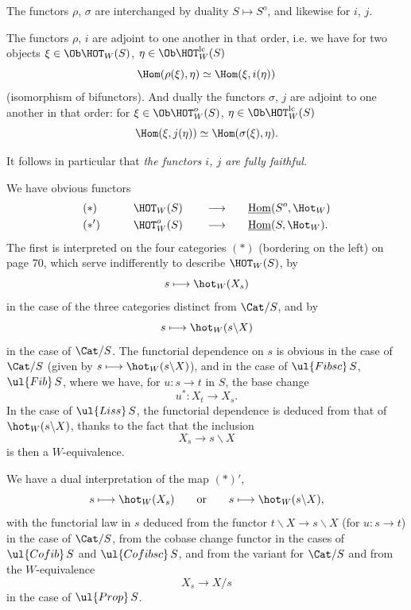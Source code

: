 The functors $\rho$, $\sigma$ are interchanged by duality $S\longmapsto S^o$, and likewise for $i$, $j$.

\quad The functors $\rho$, $i$ are adjoint to one another in that order, i.e. we have for two objects $\xi\in\Ob\HOT_W(S)$, $\eta\in\Ob\HOT^{\mathrm{lc}}_W(S)$
\[ \Hom(\rho(\xi),\eta)\simeq\Hom(\xi,i(\eta)) \]
(isomorphism of bifunctors). And dually the functors $\sigma$, $j$ are adjoint to one another %
in that order: for $\xi\in\Ob\HOT^o_W(S)$, $\eta\in\Ob\HOT^{\mathrm{lc}}_W(S)$
\[ \Hom(\xi,j(\eta))\simeq\Hom(\sigma(\xi),\eta). \]

It follows in particular that \textit{the functors $i$, $j$ are fully faithful.}

\quad We have obvious functors
\[
\begin{aligned}
&(*) &\qquad& \HOT_W(S) &\quad& \longrightarrow &\quad& \underline{\mathrm{Hom}}(S^o,\Hot_W)\\
&(*') && \HOT^o_W(S) && \longrightarrow && \underline{\mathrm{Hom}}(S,\Hot_W).
\end{aligned}
\]
The first is interpreted on the four categories $(*)$ (bordering on the left) on page 70, which serve indifferently to describe $\HOT_W(S)$, by %
\[ s\longmapsto\hot_W(X_s) \]
in the case of the three categories distinct from $\Cat/S$, and by
\[ s\longmapsto\hot_W(s\backslash X) \]
in the case of $\Cat/S$. The functorial dependence on $s$ is obvious in the case %
of $\Cat/S$ (given by $s\longmapsto\hot_W(s\backslash X)$), and in the case of $\ul{Fibsc}\,S$, $\ul{Fib}\,S$, where we have, for $u : s\longrightarrow t$ in $S$, the base change
\[ u^* : X_t\longrightarrow X_s. \]
In the case of $\ul{Liss}\,S$, the functorial dependence is deduced from that of $\hot_W(s\backslash X)$, thanks %
to the fact that the inclusion
\[ X_s\longrightarrow s\backslash X \]
is then a $W$-equivalence.

We have a dual interpretation of the map
$(*)'$, 
\[ s\longmapsto\hot_W(X_s)\qquad\text{or}\qquad s\longmapsto\hot_W(s\backslash X), \]
with the functorial law in $s$ deduced from the functor $t\backslash X\longrightarrow s\backslash X$ (for $u : s\longrightarrow t$) in the case of $\Cat/S$, from the cobase change functor in the cases of $\ul{Cofib}\,S$ and $\ul{Cofibsc}\,S$, and from the variant for $\Cat/S$ and from the $W$-equivalence
\[ X_s\longrightarrow X/s \]
in the case of $\ul{Prop}\,S$.


